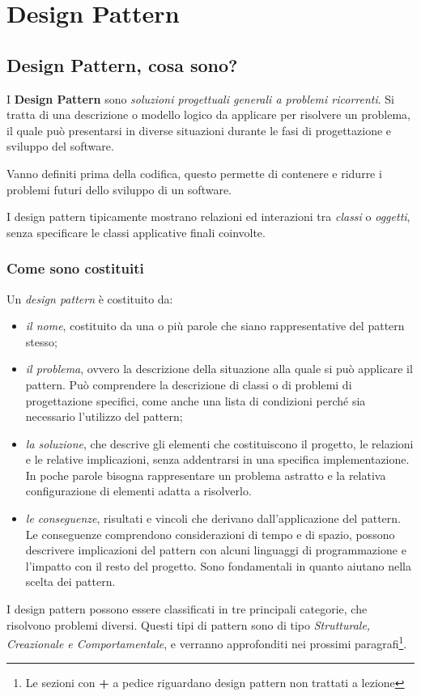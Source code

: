 \chapter{Design Pattern}
\section{Design Pattern, cosa sono?}
I \textbf{Design Pattern} sono \textit{soluzioni progettuali generali a problemi ricorrenti}.
Si tratta di una descrizione o modello logico da applicare per risolvere un problema, il quale può presentarsi in diverse situazioni durante le fasi di progettazione e sviluppo del software.

Vanno definiti prima della codifica, questo permette di contenere e ridurre i problemi futuri dello sviluppo di un software.

I design pattern tipicamente mostrano relazioni ed interazioni tra \textit{classi} o \textit{oggetti}, senza specificare le classi applicative finali coinvolte.

\subsection{Come sono costituiti}
Un \textit{design pattern} è costituito da:
\begin{itemize}
	\item \textit{il nome}, costituito da una o più parole che siano rappresentative del pattern stesso;
	\item \textit{il problema}, ovvero la descrizione della situazione alla quale si può applicare il pattern. Può comprendere la descrizione di classi o di problemi di progettazione specifici, come anche una lista di condizioni perché sia necessario l'utilizzo del pattern;
	\item \textit{la soluzione}, che descrive gli elementi che costituiscono il progetto, le relazioni e le relative implicazioni, senza addentrarsi in una specifica implementazione. In poche parole bisogna rappresentare un problema astratto e la relativa configurazione di elementi adatta a risolverlo.
	\item \textit{le conseguenze}, risultati e vincoli che derivano dall'applicazione del pattern. Le conseguenze comprendono considerazioni di tempo e di spazio, possono descrivere implicazioni del pattern con alcuni linguaggi di programmazione e l'impatto con il resto del progetto. Sono fondamentali in quanto aiutano nella scelta dei pattern.
\end{itemize}
I design pattern possono essere classificati in tre principali categorie, che risolvono problemi diversi. Questi tipi di pattern sono di tipo \textit{Strutturale, Creazionale e Comportamentale}, e verranno approfonditi nei prossimi paragrafi\footnote{Le sezioni con \textbf{+} a pedice riguardano design pattern non trattati a lezione}.

